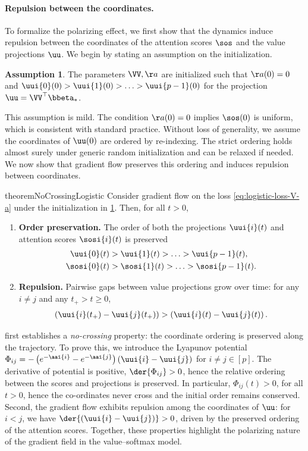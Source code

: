 \documentclass{article}
\theoremstyle{plain}
\theoremstyle{definition}
\newtheorem{assumption}[theorem]{Assumption}
\theoremstyle{remark}
\begin{document}
\paragraph{Repulsion between the coordinates.}
%
To formalize the polarizing effect, we first show that the dynamics induce repulsion between the coordinates of the attention scores $\sos$ and the value projections $\uu$. We begin by stating an assumption on the initialization. 
%
\begin{assumption}\label{ass:init}
  The parameters $\VV, \aa$ are initialized such that $\aa(0) = 0$ and  $\uui{0}(0) > \uui{1}(0) > \ldots > \uui{p-1}(0)$ for the projection $ \uu = \VV^{\top} \bbeta_*$.
\end{assumption}
%
This assumption is mild. The condition $\aa(0)=0$ implies $\sos(0)$ is uniform, which is consistent with standard practice. Without loss of generality, we assume the coordinates of $\uu(0)$ are ordered by re-indexing. The strict ordering holds almost surely under generic random initialization and can be relaxed if needed. We now show that gradient flow preserves this ordering and induces repulsion between coordinates.
%
\begin{restatable}{theorem}{NoCrossingLogistic} \label{thm:no-crossing-logitstic}
 Consider gradient flow on the loss \eqref{eq:logistic-loss-V-a} under the initialization in \cref{ass:init}. Then, for all $t > 0$,
  \begin{enumerate}[label=(\alph*)]
    \item \textbf{Order preservation.} The order of both the projections $\uui{i}(t)$ and attention scores $\sosi{i}(t)$ is preserved
  \begin{align*}
    \uui{0}(t) &> \uui{1}(t) > \ldots > \uui{p-1}(t), \\
    \sosi{0}(t) &> \sosi{1}(t) > \ldots > \sosi{p-1}(t).
  \end{align*}
  \item \textbf{Repulsion.} Pairwise gaps between value projections grow over time: for any $i \neq j$ and  any  $t_+ > t \geq 0$,
  \begin{align*}
     \left( \uui{i}(t_+) - \uui{j}(t_+) \right) > \left( \uui{i}(t) - \uui{j}(t) \right).
  \end{align*}
  \end{enumerate}
\end{restatable}
%
 first establishes a \emph{no-crossing} property: the coordinate ordering is preserved along the trajectory. To prove this, we introduce the Lyapunov potential $\Phi_{ij} = - \left( e^{-\aai{i}} - e^{-\aai{j}}  \right) \left(  \uui{i} - \uui{j} \right)$ for $i\neq j \in [p]$. The derivative of potential is positive, $\der{\Phi_{ij}} > 0 $, hence the relative ordering between the scores and projections is preserved. In particular, $\Phi_{ij}(t) > 0$, for all $t > 0$, hence the co-ordinates never cross and the initial order remains conserved.
%
Second, the gradient flow exhibits repulsion among the coordinates of $\uu$: for $i < j$, we have $\der{ (\uui{i} - \uui{j}) } > 0$, driven by the preserved ordering of the attention scores. 
%
Together, these properties highlight the polarizing nature of the gradient field in the value–softmax model.
\end{document}
